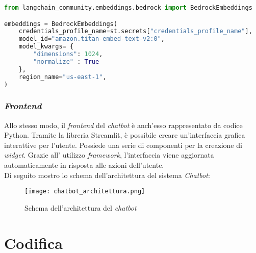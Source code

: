 \begin{lstlisting}[caption=Configurazione con LangChain di un servizio di \gls{embedding-g} offerto da \gls{aws}, label=lst:backendChatbot, language=Python]
from langchain_community.embeddings.bedrock import BedrockEmbeddings

embeddings = BedrockEmbeddings(
    credentials_profile_name=st.secrets["credentials_profile_name"],
    model_id="amazon.titan-embed-text-v2:0",
    model_kwargs= {
        "dimensions": 1024,
        "normalize" : True
    },
    region_name="us-east-1",
)
\end{lstlisting}

\subsubsection{\textit{Frontend}}
Allo stesso modo, il \textit{frontend} del \textit{chatbot} è anch'esso rappresentato da codice Python. Tramite la libreria Streamlit, è possibile creare un'interfaccia grafica interattive per l'utente. Possiede una serie di componenti per la creazione di \textit{widget}. Grazie all' utilizzo \textit{framework}, l'interfaccia viene aggiornata automaticamente in risposta alle azioni dell'utente. \\
\noindent
Di seguito mostro lo schema dell'architettura del sistema \textit{Chatbot}:
\begin{figure}[H]
    \centering
    \texttt{[image: chatbot\_architettura.png]}
    \caption{Schema dell'architettura del \textit{chatbot}}
    \label{fig:architetturaChatbot}
\end{figure}

\section{Codifica}

